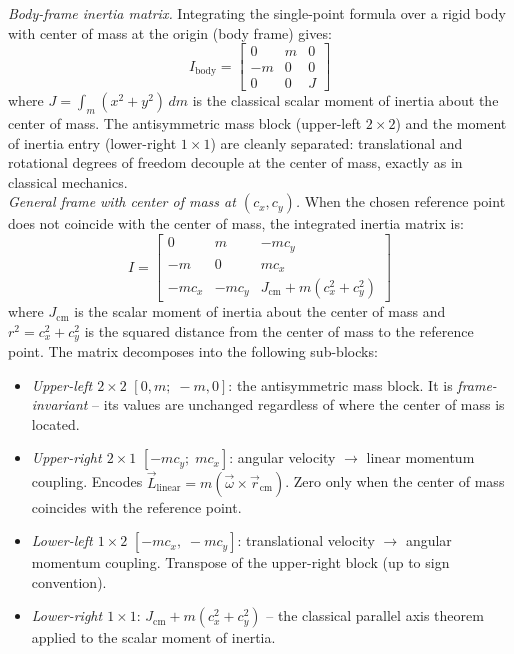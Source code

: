 \emph{Body-frame inertia matrix.} Integrating the single-point formula over a rigid body
with center of mass at the origin (body frame) gives:
\begin{equation}
    I_\mathrm{body} =
    \begin{bmatrix}
        0  &  m  &  0 \\
        -m &  0  &  0 \\
        0  &  0  &  J
    \end{bmatrix}
    \label{eq:inertia_2D_body}
\end{equation}
where $J = \int_m (x^2 + y^2)\,dm$ is the classical scalar moment of inertia about the
center of mass. The antisymmetric mass block (upper-left $2\times2$) and the moment of
inertia entry (lower-right $1\times1$) are cleanly separated: translational and rotational
degrees of freedom decouple at the center of mass, exactly as in classical mechanics. \\

\emph{General frame with center of mass at $(c_x, c_y)$.} When the chosen reference point
does not coincide with the center of mass, the integrated inertia matrix is:
\begin{equation}
    I =
    \begin{bmatrix}
        0      &  m     & -m c_y                              \\
        -m     &  0     &  m c_x                              \\
        -m c_x & -m c_y & J_\mathrm{cm} + m(c_x^2 + c_y^2)
    \end{bmatrix}
    \label{eq:inertia_2D_general}
\end{equation}
where $J_\mathrm{cm}$ is the scalar moment of inertia about the center of mass and $r^2 =
c_x^2 + c_y^2$ is the squared distance from the center of mass to the reference point. The
matrix decomposes into the following sub-blocks:
\begin{itemize}
    \item \emph{Upper-left $2\times2$} $[0, m;\; -m, 0]$: the antisymmetric mass block.
    It is \emph{frame-invariant} -- its values are unchanged regardless of where the
    center of mass is located.
    \item \emph{Upper-right $2\times1$} $[-mc_y;\; mc_x]$: angular velocity $\to$ linear
    momentum coupling. Encodes $\vec{L}_\mathrm{linear} = m(\vec{\omega} \times
    \vec{r}_\mathrm{cm})$. Zero only when the center of mass coincides with the reference
    point.
    \item \emph{Lower-left $1\times2$} $[-mc_x,\; -mc_y]$: translational velocity $\to$
    angular momentum coupling. Transpose of the upper-right block (up to sign convention).
    \item \emph{Lower-right $1\times1$}: $J_\mathrm{cm} + m(c_x^2 + c_y^2)$ -- the
    classical parallel axis theorem applied to the scalar moment of inertia.
\end{itemize}

